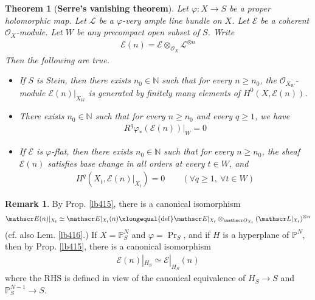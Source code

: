 \documentclass[12pt,b5paper,notitlepage]{report}
\theoremstyle{definition}
\newtheorem{rem}[df]{Remark}
\theoremstyle{plain}
\newtheorem{thm}[df]{Theorem}
\newcommand{\scr}{\mathscr}
\newcommand{\Nbb}{\mathbb N}
\newcommand{\Pbb}{\mathbb P}
\numberwithin{equation}{section}
\begin{document}
\begin{thm}[\textbf{Serre's vanishing theorem}]   \label{lb409}
Let $\varphi:X\rightarrow S$ be a proper holomorphic map. Let $\scr L$ be a $\varphi$-very ample line bundle on $X$. Let $\scr E$ be a coherent $\scr O_X$-module. Let $W$ be any precompact open subset of $S$. Write \index{En@$\scr E(x)$}
\begin{align}
    \scr E(n)=\scr E\otimes_{\scr O_X}\scr L^{\otimes n}
\end{align}
Then the following are true.
\begin{itemize}
\item[(A)] If $S$ is Stein, then there exists $n_0\in\Nbb$ such that for every $n\geq n_0$, the $\scr O_{X_W}$-module $\scr E(n)\big|_{X_W}$ is generated by finitely many elements of $H^0(X,\scr E(n))$.
\item[(B)] There exists $n_0\in\Nbb$ such that for every $n\geq n_0$ and every $q\geq1$, we have
\begin{align*}
R^q\varphi_*(\scr E(n))\big|_W=0
\end{align*}
\item[(C)] If $\scr E$ is $\varphi$-flat, then there exists $n_0\in\Nbb$ such that for every $n\geq n_0$,  the sheaf $\scr E(n)$ satisfies base change in all orders at every $t\in W$, and 
\begin{align*}
H^q(X_t,\scr E(n)|_{X_t})=0\qquad(\forall q\geq 1,~\forall t\in W)
\end{align*}
\end{itemize}
\end{thm}


\begin{rem}
By Prop. \ref{lb415}, there is a canonical isomorphism
\begin{align}
\scr E(n)|_{X_t}\simeq\scr E|_{X_t}(n)\xlongequal{\mathrm{def}}\scr E|_{X_t}\otimes_{\scr O_{X_t}}(\scr L|_{X_t})^{\otimes n}
\end{align}
(cf. also Lem. \ref{lb416}.) If $X=\Pbb^N_S$ and $\varphi=\Pr_S$, and if $H$ is a hyperplane of $\Pbb^N$, then by Prop. \ref{lb415}, there is a canonical isomorphism
\begin{align}
\scr E(n)|_{H_S}\simeq \scr E|_{H_S}(n)
\end{align}
where the RHS is defined in view of the canonical equivalence of $H_S\rightarrow S$ and $\Pbb^{N-1}_S\rightarrow S$. 
\end{rem}
\end{document}
